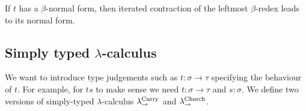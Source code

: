 \begin{boxthm}
    If $t$ has a $\beta$-normal form, then iterated contraction of the leftmost $\beta$-redex leads to its normal form.
\end{boxthm}

\subsection{Simply typed \texorpdfstring{$\lambda$}{lambda}-calculus}

We want to introduce type judgements such as $t : \sigma \to \tau$ specifying the behaviour of $t$.
For example, for $ts$ to make sense we need $t : \sigma \to \tau$ and $s : \sigma$.
We define two versions of simply-typed $\lambda$-calculus $\lambda_{\to}^{\textnormal{Curry}}$ and $\lambda_{\to}^{\textnormal{Church}}$.

